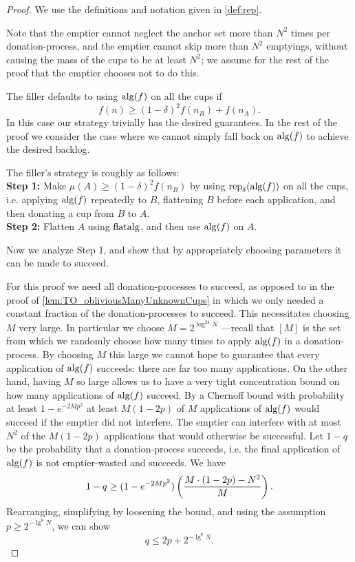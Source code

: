 \begin{proof}
  We use the definitions and notation given in \cref{def:rep}. 

  Note that the emptier cannot neglect the anchor set more than
  $N^2$ times per donation-process, and the emptier cannot skip
  more than $N^2$ emptyings, without causing the mass of the cups
  to be at least $N^2$; we assume for the rest of the proof that
  the emptier chooses not to do this.

  The filler defaults to using $\operatorname{\text{\textup{alg}}}(f)$ on all the cups if 
  $$f(n) \ge (1-\delta)^2 f(n_B) + f(n_A).$$
  In this case our strategy trivially has the desired guarantees. 
  In the rest of the proof we consider the case where we cannot
  simply fall back on $\operatorname{\text{\textup{alg}}}(f)$ to achieve the desired backlog.

  The filler's strategy is roughly as follows:\\
  \textbf{Step 1:} Make $\mu(A) \ge (1-\delta)^2 f(n_B)$ by
  using $\operatorname{\text{\textup{rep}}}_\delta(\operatorname{\text{\textup{alg}}}(f))$ on all the cups,
  i.e. applying $\operatorname{\text{\textup{alg}}}(f)$ repeatedly to $B$, flattening $B$ before
  each application, and then donating a cup from $B$ to $A$.\\
  \textbf{Step 2:} Flatten $A$ using $\operatorname{\text{\textup{flatalg}}}$, and then use
  $\operatorname{\text{\textup{alg}}}(f)$ on $A$.

  Now we analyze Step 1, and show that by appropriately choosing
  parameters it can be made to succeed.

  For this proof we need all donation-processes to succeed, as
  opposed to in the proof of \cref{lem:TO_obliviousManyUnknownCups}
  in which we only needed a constant fraction of the
  donation-processes to succeed. This necessitates choosing $M$
  very large. In particular we choose $M = 2^{\log^{24} N}$
  ---recall that $[M]$ is the set from which we randomly choose
  how many times to apply $\operatorname{\text{\textup{alg}}}(f)$ in a donation-process. 
  By choosing $M$ this large we cannot hope to guarantee that
  every application of $\operatorname{\text{\textup{alg}}}(f)$ succeeds: there are far too many
  applications. On the other hand, having $M$ so large allows us
  to have a very tight concentration bound on how many
  applications of $\operatorname{\text{\textup{alg}}}(f)$ succeed. 
  By a Chernoff bound with probability at least $1-e^{-2Mp^2}$ at
  least $M(1-2p)$ of $M$ applications of $\operatorname{\text{\textup{alg}}}(f)$ would succeed
  if the emptier did not interfere. The emptier can interfere
  with at most $N^2$ of the $M(1-2p)$ applications that would
  otherwise be successful. Let $1-q$ be the probability that a
  donation-process succeeds, i.e. the final application of $\operatorname{\text{\textup{alg}}}(f)$ is not
  emptier-wasted and succeeds. We have
  $$1-q \ge (1-e^{-2Mp^2})\left( \frac{M\cdot (1-2p)-N^2}{M} \right).$$
  Rearranging, simplifying by loosening the bound, and using the
  assumption $p \ge 2^{-\lg^8 N}$, we can show
  $$q \le 2p + 2^{-\lg^8 N}.$$


\end{proof}
